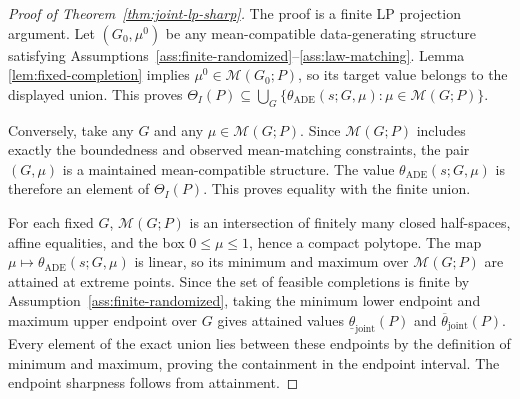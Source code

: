 \documentclass[11pt]{article}
\theoremstyle{definition}
\theoremstyle{plain}
\theoremstyle{remark}
\begin{document}
\begin{proof}[Proof of Theorem~\ref{thm:joint-lp-sharp}]
The proof is a finite LP projection argument.  Let \((G_0,\mu^0)\) be any
mean-compatible data-generating structure satisfying
Assumptions~\ref{ass:finite-randomized}--\ref{ass:law-matching}.  Lemma
\ref{lem:fixed-completion} implies \(\mu^0\in\mathcal M(G_0;P)\), so its target
value belongs to the displayed union.  This proves
\(\Theta_I(P)\subseteq\bigcup_G\{\theta_{\mathrm{ADE}}(s;G,\mu):\mu\in
\mathcal M(G;P)\}\).

Conversely, take any \(G\) and any \(\mu\in\mathcal M(G;P)\).  Since
\(\mathcal M(G;P)\) includes exactly the boundedness and observed mean-matching
constraints, the pair \((G,\mu)\) is a maintained mean-compatible structure.
The value \(\theta_{\mathrm{ADE}}(s;G,\mu)\) is therefore an element of
\(\Theta_I(P)\).  This proves equality with the finite union.

For each fixed \(G\), \(\mathcal M(G;P)\) is an intersection of finitely many
closed half-spaces, affine equalities, and the box \(0\le\mu\le1\), hence a
compact polytope.  The map \(\mu\mapsto\theta_{\mathrm{ADE}}(s;G,\mu)\) is
linear, so its minimum and maximum over \(\mathcal M(G;P)\) are attained at
extreme points.  Since the set of feasible completions is finite by
Assumption~\ref{ass:finite-randomized}, taking the minimum lower endpoint and
maximum upper endpoint over \(G\) gives attained values
\(\underline\theta_{\mathrm{joint}}(P)\) and
\(\overline\theta_{\mathrm{joint}}(P)\).  Every element of the exact union lies
between these endpoints by the definition of minimum and maximum, proving the
containment in the endpoint interval.  The endpoint sharpness follows from
attainment.
\end{proof}
\end{document}
